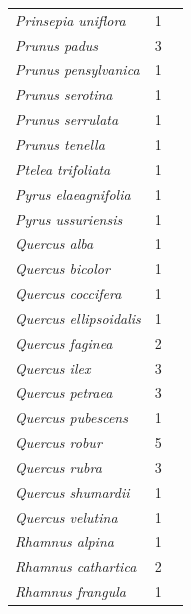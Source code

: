 \documentclass[11pt]{article}
\begin{document}
\begin{longtable}{p{}p{}p{}}
  \emph{Prinsepia uniflora} &   1 & \emph{\citep{zohner2016}} \\ 
  \emph{Prunus padus} &   3 & \emph{\citep{Heide:1993,Myking:1998aa,zohner2016}} \\ 
  \emph{Prunus pensylvanica} &   1 & \emph{\citep{flynn2018}} \\ 
  \emph{Prunus serotina} &   1 & \emph{\citep{Laube:2014a}} \\ 
  \emph{Prunus serrulata} &   1 & \emph{\citep{zohner2016}} \\ 
  \emph{Prunus tenella} &   1 & \emph{\citep{zohner2016}} \\ 
  \emph{Ptelea trifoliata} &   1 & \emph{\citep{zohner2016}} \\ 
  \emph{Pyrus elaeagnifolia} &   1 & \emph{\citep{zohner2016}} \\ 
  \emph{Pyrus ussuriensis} &   1 & \emph{\citep{zohner2016}} \\ 
  \emph{Quercus alba} &   1 & \emph{\citep{flynn2018}} \\ 
  \emph{Quercus bicolor} &   1 & \emph{\citep{Laube:2014a}} \\ 
  \emph{Quercus coccifera} &   1 & \emph{\citep{Sanz-Perez:2010aa}} \\ 
  \emph{Quercus ellipsoidalis} &   1 & \emph{\citep{nanninga17}} \\ 
  \emph{Quercus faginea} &   2 & \emph{\citep{Sanz-Perez:2009aa,Sanz-Perez:2010aa}} \\ 
  \emph{Quercus ilex} &   3 & \emph{\citep{Morin:2010aa,Sanz-Perez:2009aa,Sanz-Perez:2010aa}} \\ 
  \emph{Quercus petraea} &   3 & \emph{\citep{Basler:2012,Basler:2014aa,vitra17}} \\ 
  \emph{Quercus pubescens} &   1 & \emph{\citep{Morin:2010aa}} \\ 
  \emph{Quercus robur} &   5 & \emph{\citep{Laube:2014a,Laube:2014b,malyshev2018,Morin:2010aa,zohner2016}} \\ 
  \emph{Quercus rubra} &   3 & \emph{\citep{Calme:1994aa,flynn2018,Laube:2014a}} \\ 
  \emph{Quercus shumardii} &   1 & \emph{\citep{zohner2016}} \\ 
  \emph{Quercus velutina} &   1 & \emph{\citep{flynn2018}} \\ 
  \emph{Rhamnus alpina} &   1 & \emph{\citep{zohner2016}} \\ 
  \emph{Rhamnus cathartica} &   2 & \emph{\citep{nanninga17,zohner2016}} \\ 
  \emph{Rhamnus frangula} &   1 & \emph{\citep{flynn2018}} \\ 

\end{longtable}
\end{document}
